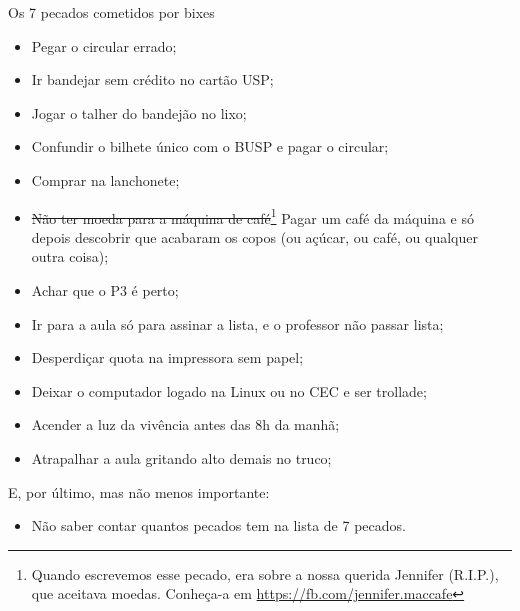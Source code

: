 \begin{editorial}{Os 7 pecados cometidos por bixes}
\begin{itemize}
  \item Pegar o circular errado;
  \item Ir bandejar sem crédito no cartão USP;
  \item Jogar o talher do bandejão no lixo;
  \item Confundir o bilhete único com o BUSP e pagar o circular;
  \item Comprar na lanchonete;
  \item \sout{Não ter moeda para a máquina de café}\footnote{Quando escrevemos
    esse pecado, era sobre a nossa querida Jennifer (R.I.P.), que aceitava
    moedas. Conheça-a em \url{https://fb.com/jennifer.maccafe}} Pagar um café da
    máquina e só depois descobrir que acabaram os copos (ou açúcar, ou café,
    ou qualquer outra coisa);
  \item Achar que o P3 é perto;
  \item Ir para a aula só para assinar a lista, e o professor não passar lista;
  \item Desperdiçar quota na impressora sem papel;
  \item Deixar o computador logado na Linux ou no CEC e ser trollade;
  \item Acender a luz da vivência antes das 8h da manhã;
  \item Atrapalhar a aula gritando alto demais no truco;
\end{itemize}
E, por último, mas não menos importante:
\begin{itemize}
  \item Não saber contar quantos pecados tem na lista de 7 pecados.
\end{itemize}

\end{editorial}

